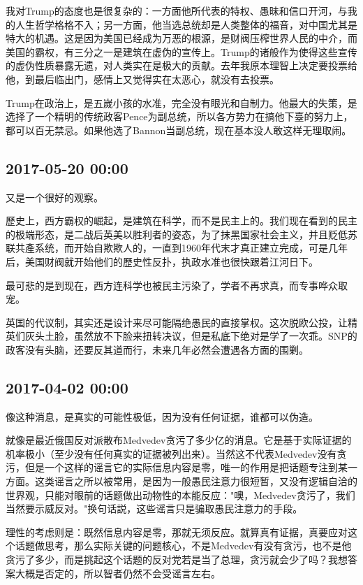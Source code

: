 \documentclass[twocolumn]{ctexart}
\begin{document}
我对Trump的态度也是很复杂的：一方面他所代表的特权、愚昧和信口开河，与我的人生哲学格格不入；另一方面，他当选总统却是人类整体的福音，对中国尤其是特大的机遇。这是因为美国已经成为万恶的根源，是财阀压榨世界人民的中介，而美国的霸权，有三分之一是建筑在虚伪的宣传上。Trump的诸般作为使得这些宣传的虚伪性质暴露无遗，对人类实在是极大的贡献。去年我原本理智上决定要投票给他，到最后临出门，感情上又觉得实在太恶心，就没有去投票。

Trump在政治上，是五嵗小孩的水准，完全没有眼光和自制力。他最大的失策，是选择了一个精明的传统政客Pence为副总统，所以各方势力在搞他下臺的努力上，都可以百无禁忌。如果他选了Bannon当副总统，现在基本没人敢这样无理取闹。\subsection*{2017-05-20 00:00}
又是一个很好的观察。

歷史上，西方霸权的崛起，是建筑在科学，而不是民主上的。我们现在看到的民主的极端形态，是二战后英美以胜利者的姿态，为了抹黑国家社会主义，并且贬低苏联共產系统，而开始自欺欺人的，一直到1960年代末才真正建立完成，可是几年后，美国财阀就开始他们的歷史性反扑，执政水准也很快跟着江河日下。

最可悲的是到现在，西方连科学也被民主污染了，学者不再求真，而专事哗众取宠。

英国的代议制，其实还是设计来尽可能隔绝愚民的直接掌权。这次脱欧公投，让精英们灰头土脸，虽然放不下脸来扭转决议，但是私底下绝对是学了一次乖。SNP的政客没有头脑，还要反其道而行，未来几年必然会遭遇各方面的围剿。\subsection*{2017-04-02 00:00}
像这种消息，是真实的可能性极低，因为没有任何证据，谁都可以伪造。

就像是最近俄国反对派散布Medvedev贪污了多少亿的消息。它是基于实际证据的机率极小（至少没有任何真实的证据被列出来）。当然这不代表Medvedev没有贪污，但是一个这样的谣言它的实际信息内容是零，唯一的作用是把话题专注到某一方面。这类谣言之所以被常用，是因为一般愚民注意力很短暂，又没有逻辑自洽的世界观，只能对眼前的话题做出动物性的本能反应："噢，Medvedev贪污了，我们当然要示威反对。"换句话説，这些谣言只是骗取愚民注意力的手段。

理性的考虑则是：既然信息内容是零，那就无须反应。就算真有证据，真要应对这个话题做思考，那么实际关键的问题核心，不是Medvedev有没有贪污，也不是他贪污了多少，而是挑起这个话题的反对党若是当了总理，贪污就会少了吗？我想答案大概是否定的，所以智者仍然不会受谣言左右。
\end{document}

